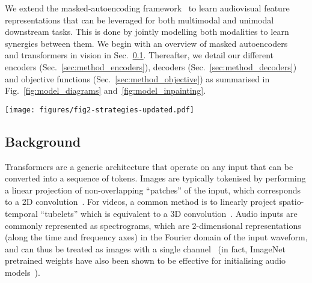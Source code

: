 \documentclass[10pt,twocolumn,letterpaper]{article}
\begin{document}
We extend the masked-autoencoding framework~\cite{he2022masked} to learn audiovisual feature representations that can be leveraged for both multimodal and unimodal downstream tasks.
This is done by jointly modelling both modalities to learn synergies between them.
We begin with an overview of masked autoencoders~\cite{he2022masked} and transformers in vision in Sec.~\ref{sec:method_background}.
Thereafter, we detail our different encoders (Sec.~\ref{sec:method_encoders}), decoders (Sec.~\ref{sec:method_decoders}) and objective functions (Sec.~\ref{sec:method_objective}) as summarised in Fig.~\ref{fig:model_diagrams} and~\ref{fig:model_inpainting}.

\begin{figure*}[t]
    \centering
    \vspace{-0.7\baselineskip}
    \texttt{[image: figures/fig2-strategies-updated.pdf]} \vspace{-0.7\baselineskip}
    \caption{
    	Transformer architectures for performing audiovisual fusion.
    	Concatenating the tokens before passing them through the transformer corresponds  to ``early fusion'' (a), whilst using two separate encoders (b) can be used to perform ``late fusion'' in the subsequent decoder.
    	An alternate method of coupling modalities together is by sharing weights between the two encoders (c).
    	Finally, mid-fusion (d) represents a balance between ``early'' and ``late'' fusion.
	}
	\vspace{-1.5\baselineskip}
    \label{fig:model_diagrams}
\end{figure*} 
\vspace{-0.2\baselineskip}
\subsection{Background}
\label{sec:method_background}
\vspace{-0.2\baselineskip}

Transformers are a generic architecture that operate on any input that can be converted into a sequence of tokens.
Images are typically tokenised by performing a linear projection of non-overlapping ``patches'' of the input, which corresponds to a 2D convolution~\cite{dosovitskiy_iclr_2021}.
For videos, a common method is to linearly project spatio-temporal ``tubelets'' which is equivalent to a 3D convolution~\cite{arnab2021vivit}.
Audio inputs are commonly represented as spectrograms, which are 2-dimensional representations (along the time and frequency axes) in the Fourier domain of the input waveform, and can thus be treated as images with a single channel~\cite{gong2021ast} (in fact, ImageNet pretrained weights have also been shown to be effective for initialising audio models~\cite{gong2021ast,gwardys2014deep,guzhov2021esresnet}). 
\end{document}
